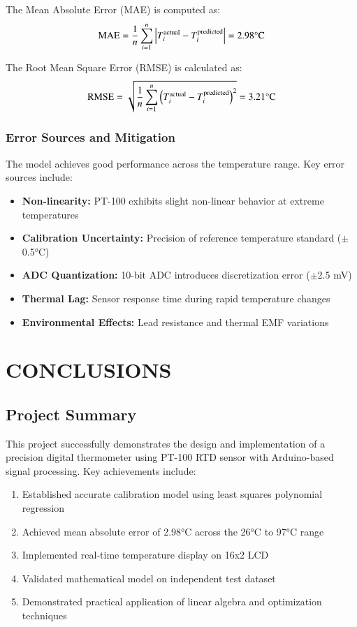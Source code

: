 \documentclass[journal]{IEEEtran}
\begin{document}
The Mean Absolute Error (MAE) is computed as:
\begin{align}
\text{MAE} = \frac{1}{n}\sum_{i=1}^{n}\left\vert T_i^{\text{actual}} - T_i^{\text{predicted}}\right\vert = 2.98\text{°C}
\end{align}

The Root Mean Square Error (RMSE) is calculated as:
\begin{align}
\text{RMSE} = \sqrt{\frac{1}{n}\sum_{i=1}^{n}\left(T_i^{\text{actual}} - T_i^{\text{predicted}}\right)^2} = 3.21\text{°C}
\end{align}

\subsubsection{\textbf{Error Sources and Mitigation}}

The model achieves good performance across the temperature range. Key error sources include:

\begin{itemize}
\item \textbf{Non-linearity:} PT-100 exhibits slight non-linear behavior at extreme temperatures
\item \textbf{Calibration Uncertainty:} Precision of reference temperature standard (\(\pm\)0.5°C)
\item \textbf{ADC Quantization:} 10-bit ADC introduces discretization error (\(\pm\)2.5 mV)
\item \textbf{Thermal Lag:} Sensor response time during rapid temperature changes
\item \textbf{Environmental Effects:} Lead resistance and thermal EMF variations
\end{itemize}

\section{\textbf{CONCLUSIONS}}

\subsection{\textbf{Project Summary}}

This project successfully demonstrates the design and implementation of a precision digital thermometer using PT-100 RTD sensor with Arduino-based signal processing. Key achievements include:

\begin{enumerate}
\item Established accurate calibration model using least squares polynomial regression
\item Achieved mean absolute error of 2.98°C across the 26°C to 97°C range
\item Implemented real-time temperature display on 16x2 LCD
\item Validated mathematical model on independent test dataset
\item Demonstrated practical application of linear algebra and optimization techniques
\end{enumerate}
\end{document}
